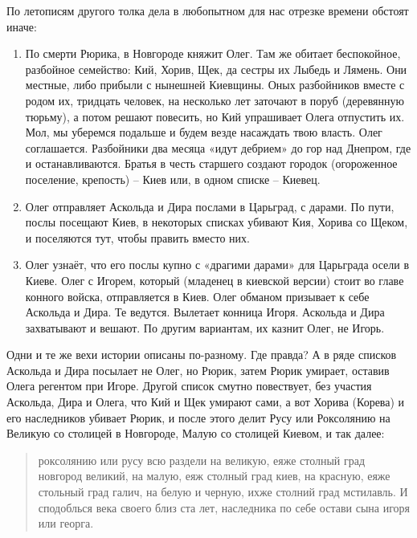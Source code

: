 По летописям другого толка дела в любопытном для нас отрезке времени обстоят иначе:

\begin{enumerate}
\item По смерти Рюрика, в Новгороде княжит Олег. Там же обитает беспокойное, разбойное семейство: Кий, Хорив, Щек, да сестры их Лыбедь и Лямень. Они местные, либо прибыли с нынешней Киевщины. Оных разбойников вместе с родом их, тридцать человек, на несколько лет заточают в поруб (деревянную тюрьму), а потом решают повесить, но Кий упрашивает Олега отпустить их. Мол, мы уберемся подальше и будем везде насаждать твою власть. Олег соглашается. Разбойники два месяца «идут дебрием» до гор над Днепром, где и останавливаются. Братья в честь старшего создают городок (огороженное поселение, крепость) – Киев или, в одном списке – Киевец.

\item Олег отправляет Аскольда и Дира послами в Царьград, с дарами. По пути, послы посещают Киев, в некоторых списках убивают Кия, Хорива со Щеком, и поселяются тут, чтобы править вместо них.

\item Олег узнаёт, что его послы купно с «драгими дарами» для Царьграда осели в Киеве. Олег с Игорем, который (младенец в киевской версии) стоит во главе конного войска, отправляется в Киев. Олег обманом призывает к себе Аскольда и Дира. Те ведутся. Вылетает конница Игоря. Аскольда и Дира захватывают и вешают. По другим вариантам, их казнит Олег, не Игорь.
\end{enumerate}

Одни и те же вехи истории описаны по-разному. Где правда? А в ряде списков Аскольда и Дира посылает не Олег, но Рюрик, затем Рюрик умирает, оставив Олега регентом при Игоре. Другой список смутно повествует, без участия Аскольда, Дира и Олега, что Кий и Щек умирают сами, а вот Хорива (Корева) и его наследников убивает Рюрик, и после этого делит Русу или Роксолянию на Великую со столицей в Новгороде, Малую со столицей Киевом, и так далее:

\begin{quotation}
роксолянию или русу всю раздели на великую, еяже столный град новгород великий, на малую, еяж столный град киев, на красную, еяже стольный град галич, на белую и черную, ихже столний град мстилавль. И сподоблься века своего близ ста лет, наследника по себе остави сына игоря или георга.
\end{quotation}


